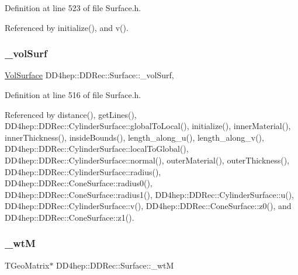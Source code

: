 Definition at line 523 of file Surface.\+h.



Referenced by initialize(), and v().

\hypertarget{class_d_d4hep_1_1_d_d_rec_1_1_surface_a5555dbcfaaa833c3169aec39f447b2c3}{}\label{class_d_d4hep_1_1_d_d_rec_1_1_surface_a5555dbcfaaa833c3169aec39f447b2c3} 
\subsubsection{\texorpdfstring{\+\_\+vol\+Surf}{\_volSurf}}
{\footnotesize\ttfamily \hyperlink{class_d_d4hep_1_1_d_d_rec_1_1_vol_surface}{Vol\+Surface} D\+D4hep\+::\+D\+D\+Rec\+::\+Surface\+::\+\_\+vol\+Surf\hspace{0.3cm}{\ttfamily [mutable]}, {\ttfamily [protected]}}



Definition at line 516 of file Surface.\+h.



Referenced by distance(), get\+Lines(), D\+D4hep\+::\+D\+D\+Rec\+::\+Cylinder\+Surface\+::global\+To\+Local(), initialize(), inner\+Material(), inner\+Thickness(), inside\+Bounds(), length\+\_\+along\+\_\+u(), length\+\_\+along\+\_\+v(), D\+D4hep\+::\+D\+D\+Rec\+::\+Cylinder\+Surface\+::local\+To\+Global(), D\+D4hep\+::\+D\+D\+Rec\+::\+Cylinder\+Surface\+::normal(), outer\+Material(), outer\+Thickness(), D\+D4hep\+::\+D\+D\+Rec\+::\+Cylinder\+Surface\+::radius(), D\+D4hep\+::\+D\+D\+Rec\+::\+Cone\+Surface\+::radius0(), D\+D4hep\+::\+D\+D\+Rec\+::\+Cone\+Surface\+::radius1(), D\+D4hep\+::\+D\+D\+Rec\+::\+Cylinder\+Surface\+::u(), D\+D4hep\+::\+D\+D\+Rec\+::\+Cylinder\+Surface\+::v(), D\+D4hep\+::\+D\+D\+Rec\+::\+Cone\+Surface\+::z0(), and D\+D4hep\+::\+D\+D\+Rec\+::\+Cone\+Surface\+::z1().

\hypertarget{class_d_d4hep_1_1_d_d_rec_1_1_surface_acbbdd616ea4e084228084cd6d94dff99}{}\label{class_d_d4hep_1_1_d_d_rec_1_1_surface_acbbdd616ea4e084228084cd6d94dff99} 
\subsubsection{\texorpdfstring{\+\_\+wtM}{\_wtM}}
{\footnotesize\ttfamily T\+Geo\+Matrix$\ast$ D\+D4hep\+::\+D\+D\+Rec\+::\+Surface\+::\+\_\+wtM\hspace{0.3cm}{\ttfamily [protected]}}



